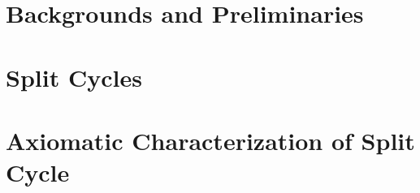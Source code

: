 \documentclass[a4paper,12pt,oneside]{book}
\begin{document}
\tableofcontents

\part{Backgrounds and Preliminaries}







\part{Split Cycles}



\part{Axiomatic Characterization of Split Cycle}



\printbibliography
\end{document}
